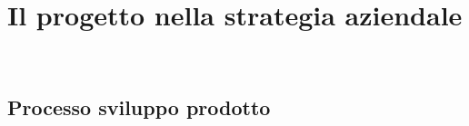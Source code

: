 
\chapter{Il progetto nella strategia aziendale}
\label{cap:processi-metodologie}

\\

\section{Processo sviluppo prodotto}